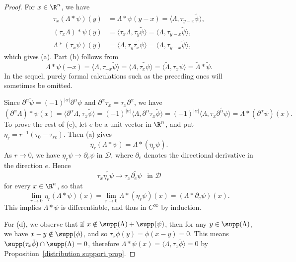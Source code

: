 \begin{proof}
For $x\in\R^n$, we have
\begin{equation*}
\begin{aligned}
\tau_x(\Lambda\ast\psi)(y)&=\Lambda\ast\psi(y-x)=\langle\Lambda,\tau_{y-x}\tilde{\psi}\rangle,\\
(\tau_x\Lambda)\ast\psi(y)&=\langle\tau_x\Lambda,\tau_y\tilde{\psi}\rangle=\langle\Lambda,\tau_{y-x}\tilde{\psi}\rangle,\\
\Lambda\ast(\tau_x\psi)(y)&=\langle\Lambda,\tau_y\widetilde{\tau_x\psi}\rangle=\langle\Lambda,\tau_{y-x}\tilde{\psi}\rangle,
\end{aligned}
\end{equation*}
which gives (a). Part (b) follows from
\[\Lambda\ast\psi(-x)=\langle\Lambda,\tau_{-x}\tilde{\psi}\rangle=\langle\Lambda,\widetilde{\tau_x\psi}\rangle=\langle\widetilde{\Lambda},\tau_x\psi\rangle=\widetilde{\Lambda}\ast\tilde{\psi}.\]
In the sequel, purely formal calculations such as the preceding ones will sometimes be omitted.\par
Since $\partial^\alpha\tilde{\psi}=(-1)^{|\alpha|}\partial^\alpha\psi$ and $\partial^\alpha\tau_x=\tau_x\partial^\alpha$, we have
\[(\partial^\alpha\Lambda)\ast\psi(x)=\langle\partial^\alpha\Lambda,\tau_x\tilde{\psi}\rangle=(-1)^{|\alpha|}\langle\Lambda,\partial^\alpha\tau_x\tilde{\psi}\rangle=(-1)^{|\alpha|}\langle\Lambda,\tau_x\widetilde{\partial^\alpha\psi}\rangle=\Lambda\ast(\partial^\alpha\psi)(x).\]
To prove the rest of (c), let $e$ be a unit vector in $\R^n$, and put $\eta_r=r^{-1}(\tau_0-\tau_{re})$. Then (a) gives
\[\eta_r(\Lambda\ast\psi)=\Lambda\ast(\eta_r\psi).\]
As $r\to 0$, we have $\eta_r\psi\to\partial_e\psi$ in $\mathscr{D}$, where $\partial_e$ denotes the directional derivative in the direction $e$. Hence
\[\tau_x\widetilde{\eta_r\psi}\to\tau_x\widetilde{\partial_e\psi}\ \ \text{ in }\mathscr{D}\]
for every $x\in\R^n$, so that
\[\lim_{r\to 0}\eta_r(\Lambda\ast\psi)(x)=\lim_{r\to 0}\Lambda\ast(\eta_r\psi)(x)=(\Lambda\ast\partial_e\psi)(x).\]
This implies $\Lambda\ast\psi$ is differentiable, and thus in $C^\infty$ by induction.\par
For (d), we observe that if $x\notin\supp(\Lambda)+\supp(\psi)$, then for any $y\in\supp(\Lambda)$, we have $x-y\notin\supp(\phi)$, and so $\tau_x\tilde{\phi}(y)=\phi(x-y)=0$. This means $\supp(\tau_x\tilde{\phi})\cap\supp(\Lambda)=0$, therefore $\Lambda\ast\psi(x)=\langle\Lambda,\tau_x\tilde{\phi}\rangle=0$ by Proposition~\ref{distribution support prop}.\par

\end{proof}
